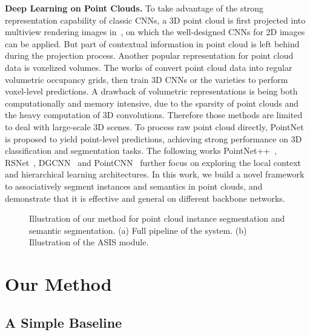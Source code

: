 \documentclass[10pt,twocolumn,letterpaper]{article}
\newcommand{\myparagraph}[1]{{\vspace{0.5em} \noindent \bf #1}}
\begin{document}
\myparagraph{Deep Learning on Point Clouds.}
To take advantage of the  strong representation capability of classic CNNs, a 3D point cloud is first projected into multiview rendering images in~\cite{su2015multi,shideeppano,qi2016volumetric,guerry2017snapnet}, on which the well-designed CNNs for 2D images can be applied.
But part of contextual information in point cloud is left behind during the projection process.
Another popular representation for point cloud data is voxelized volumes. The works of
\cite{wu20153d,maturana2015voxnet,jingicpr,riegler2017octnet} convert point cloud data into regular volumetric occupancy grids, then train 3D CNNs or the varieties to perform voxel-level predictions. 
A drawback of volumetric representations is being both computationally and memory intensive, due to the sparsity of point clouds and the heavy computation of 3D convolutions. Therefore
those methods are limited to deal with large-scale 3D scenes.
To process raw point cloud directly, PointNet~\cite{Qi_2017_CVPR} is proposed to yield point-level predictions, achieving strong performance on 3D classification and segmentation tasks.
The following works PointNet++~\cite{qi2017pointnet++}, RSNet~\cite{huang2018recurrent}, DGCNN~\cite{dgcnn} and PointCNN~\cite{li2018pointcnn} further focus on exploring the local context and hierarchical learning architectures.
In this work, we build a novel framework to associatively segment instances and semantics in point clouds, and demonstrate that it is effective and general on different backbone networks.



\begin{figure*}[htbp]
\centering
{}
\hspace{.3in}
\caption{Illustration of our method for point cloud instance segmentation and semantic segmentation. (a) Full pipeline of the system.   (b) Illustration of the ASIS module.}
\label{fig:framework}
\end{figure*}


\section{Our Method}

\subsection{A Simple Baseline}
\label{subsec:baseline}
\end{document}
